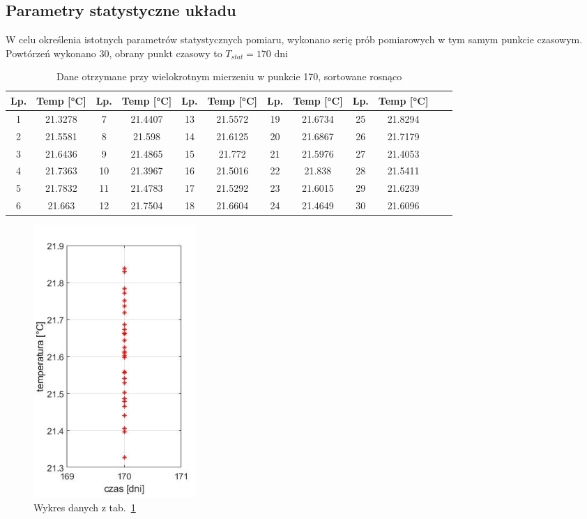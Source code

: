 \documentclass[a4paper, 12pt]{mwart}
\begin{document}
		\subsection{Parametry statystyczne układu} \label{subsec:stats}
			
			W celu określenia istotnych parametrów statystycznych pomiaru, wykonano serię prób pomiarowych
			w tym samym punkcie czasowym. Powtórzeń wykonano 30, obrany punkt czasowy to $ T_{stat} = 170 \text{ dni} $

			\begin{table}[h]
				\center
				\begin{tabular}{|c|c||c|c||c|c||c|c||c|c||c|c|}
					\hline
					Lp. & Temp [°C] & Lp. & Temp [°C] & Lp. & Temp [°C] & Lp. & Temp [°C] & Lp. & Temp [°C]\\ \hline \hline
					1 & 21.3278 & 7 & 21.4407 & 13 & 21.5572 & 19 & 21.6734 & 25 & 21.8294 \\ \hline
					2 & 21.5581 & 8 & 21.598 & 14 & 21.6125 & 20 & 21.6867 & 26 & 21.7179 \\ \hline
					3 & 21.6436 & 9 & 21.4865 & 15 & 21.772 & 21 & 21.5976 & 27 & 21.4053 \\ \hline
					4 & 21.7363 & 10 & 21.3967 & 16 & 21.5016 & 22 & 21.838 & 28 & 21.5411 \\ \hline
					5 & 21.7832 & 11 & 21.4783 & 17 & 21.5292 & 23 & 21.6015 & 29 & 21.6239 \\ \hline
					6 & 21.663 & 12 & 21.7504 & 18 & 21.6604 & 24 & 21.4649 & 30 & 21.6096 \\ \hline
				\end{tabular}
				\caption{Dane otrzymane przy wielokrotnym mierzeniu w punkcie 170, sortowane rosnąco}
				\label{tab:stat}
			\end{table}

			\begin{figure}	
				\begin{center}
					\includegraphics[width = 0.3\textwidth]{graphs/1C.jpg}
					\caption{Wykres danych z tab.~\ref{tab:stat}}
					\label{fig:stat}
				\end{center}
			\end{figure}
\end{document}
